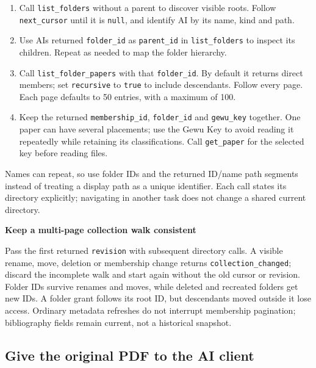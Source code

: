 \documentclass[10pt,letterpaper,oneside]{scrreprt}
\providecommand{\tightlist}{\setlength{\itemsep}{1pt}\setlength{\parskip}{0pt}}
\renewenvironment{quote}
  {\Needspace{5\baselineskip}\begin{tcolorbox}[enhanced,breakable,colback=GewuPale,colframe=GewuPale,boxrule=0pt,
    borderline west={1.6pt}{0pt}{GewuBlue},arc=1.2mm,left=2.5mm,right=2.5mm,top=1.7mm,bottom=1.7mm,
    before skip=4pt,after skip=5pt,fontupper=\color{GewuInk}\small]}
  {\end{tcolorbox}}
\begin{document}
\begin{enumerate}
\tightlist
\item
  Call \texttt{list\_folders} without a parent to discover visible roots. Follow \texttt{next\_cursor} until it is \texttt{null}, and identify AI by its name, kind and path.
\item
  Use AI\textquotesingle s returned \texttt{folder\_id} as \texttt{parent\_id} in \texttt{list\_folders} to inspect its children. Repeat as needed to map the folder hierarchy.
\item
  Call \texttt{list\_folder\_papers} with that \texttt{folder\_id}. By default it returns direct members; set \texttt{recursive} to \texttt{true} to include descendants. Follow every page. Each page defaults to 50 entries, with a maximum of 100.
\item
  Keep the returned \texttt{membership\_id}, \texttt{folder\_id} and \texttt{gewu\_key} together. One paper can have several placements; use the Gewu Key to avoid reading it repeatedly while retaining its classifications. Call \texttt{get\_paper} for the selected key before reading files.
\end{enumerate}

Names can repeat, so use folder IDs and the returned ID/name path segments instead of treating a display path as a unique identifier. Each call states its directory explicitly; navigating in another task does not change a shared current directory.

\begin{quote}
\textbf{Keep a multi-page collection walk consistent}

Pass the first returned \texttt{revision} with subsequent directory calls. A visible rename, move, deletion or membership change returns \texttt{collection\_changed}; discard the incomplete walk and start again without the old cursor or revision. Folder IDs survive renames and moves, while deleted and recreated folders get new IDs. A folder grant follows its root ID, but descendants moved outside it lose access. Ordinary metadata refreshes do not interrupt membership pagination; bibliography fields remain current, not a historical snapshot.
\end{quote}

\subsection{Give the original PDF to the AI client}\label{give-the-original-pdf-to-the-ai-client}
\end{document}
